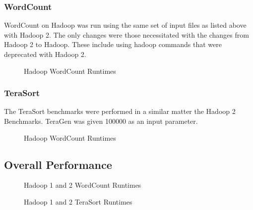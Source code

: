 \documentclass[conference]{IEEEtran}
\begin{document}
					\subsubsection{WordCount}
					WordCount on Hadoop was run using the same set of input files as listed above with Hadoop 2. The only changes were those necessitated with the changes from Hadoop 2 to Hadoop. These include using hadoop commands that were deprecated with Hadoop 2.
						\begin{figure}[h]
                   					\begin{center}
                       						
                        						\caption{Hadoop WordCount Runtimes}
                    				\end{center}
                  			\end{figure}
					\subsubsection{TeraSort}
						The TeraSort benchmarks were performed in a similar matter the Hadoop 2 Benchmarks. TeraGen was given 100000 as an input parameter.
						\begin{figure}[h]
                   					\begin{center}
                        						\caption{Hadoop WordCount Runtimes}
                    				\end{center}
                  			\end{figure}
				\subsection{Overall Performance}
						\begin{figure}[h]
                   					\begin{center}
                       						
                        						\caption{Hadoop 1 and 2 WordCount Runtimes}
                    					\end{center}
						\end{figure}
						\begin{figure}[h]
                   					\begin{center}
                        					\caption{Hadoop 1 and 2 TeraSort Runtimes}
                    				\end{center}
                  			\end{figure}
\end{document}
